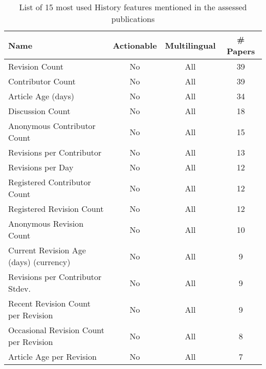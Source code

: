 \begin{table}[htbp]
    \caption{List of 15 most used History features mentioned in the assessed publications}
    \label{tab:feat_History}
    \centering
    \begin{tabular}{m{} c c c}
        \toprule
        \textbf{Name} & \textbf{Actionable} & \textbf{Multilingual} & \textbf{\# Papers} \\ 
        \midrule
        Revision Count & No & All & 39 \\
        Contributor Count & No & All & 39 \\
        Article Age (days) & No & All & 34 \\
        Discussion Count & No & All & 18 \\
        Anonymous Contributor Count & No & All & 15 \\
        Revisions per Contributor & No & All & 13 \\
        Revisions per Day & No & All & 12 \\
        Registered Contributor Count & No & All & 12 \\
        Registered Revision Count & No & All & 12 \\
        Anonymous Revision Count & No & All & 10 \\
        Current Revision Age (days) (currency) & No & All & 9 \\
        Revisions per Contributor Stdev. & No & All & 9 \\
        Recent Revision Count per Revision & No & All & 9 \\
        Occasional Revision Count per Revision  & No & All & 8 \\
        Article Age per Revision & No & All & 7 \\
        \bottomrule
    \end{tabular}
\end{table}